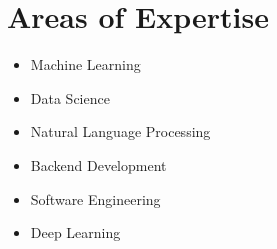 \section{Areas of Expertise}
\begin{center}
    \begin{minipage}[t]{0.35\textwidth}
            \begin{itemize}
                \item Machine Learning
                \item Data Science
            \end{itemize}
    \end{minipage}%
    \begin{minipage}[t]{0.32\textwidth}
            \begin{itemize}
                \item Natural Language Processing
                \item Backend Development
            \end{itemize}
    \end{minipage}%
    \begin{minipage}[t]{0.3\textwidth}
            \begin{itemize}
                \item Software Engineering
                \item Deep Learning
            \end{itemize}
    \end{minipage}
\end{center}